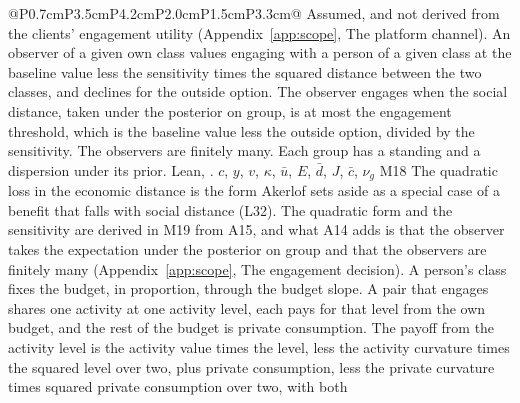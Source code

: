 \begin{longtable}{@{}P{0.7cm}P{3.5cm}P{4.2cm}P{2.0cm}P{1.5cm}P{3.3cm}@{}}
  {Assumed, and not derived from the clients' engagement utility
  (Appendix~\ref{app:scope}, The platform channel).}
  {An observer of a given own class values engaging with a person of a given
  class at the baseline value less the sensitivity times the squared
  distance between the two classes, and declines for the outside option. The
  observer engages when the social distance, taken under the posterior on
  group, is at most the engagement threshold, which is the baseline value
  less the outside option, divided by the sensitivity. The observers are
  finitely many. Each group has a standing and a dispersion under its prior.
  Lean, .}
  {$c$, $y$, $v$, $\kappa$, $\bar u$, $E$, $\bar d$, $J$, $\bar c$, $\nu_g$}
  {M18}
  {The quadratic loss in the economic distance is the form
  Akerlof sets aside as a special case of a benefit that falls with social
  distance (L32). The quadratic form and the sensitivity are derived in M19
  from A15, and what A14 adds is that the observer takes the expectation
  under the posterior on group and that the observers are finitely many
  (Appendix~\ref{app:scope}, The engagement decision).}
  {A person's class fixes the budget, in proportion, through the budget
  slope. A pair that engages shares one activity at one activity level,
  each pays for that level from the own budget, and the rest of the budget
  is private consumption. The payoff from the activity level is the
  activity value times the level, less the activity curvature times the
  squared level over two, plus private consumption, less the private
  curvature times squared private consumption over two, with both
}
\end{longtable}
